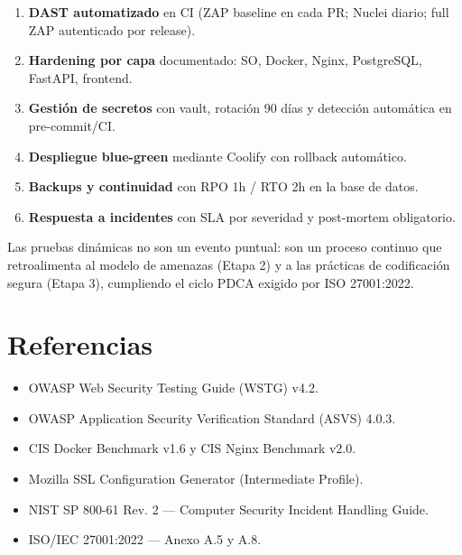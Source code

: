 \documentclass[12pt,a4paper,oneside]{article}
\begin{document}
\begin{enumerate}[leftmargin=*]
  \item \textbf{DAST automatizado} en CI (ZAP baseline en cada PR; Nuclei diario; full ZAP autenticado por release).
  \item \textbf{Hardening por capa} documentado: SO, Docker, Nginx, PostgreSQL, FastAPI, frontend.
  \item \textbf{Gestión de secretos} con vault, rotación 90 días y detección automática en pre-commit/CI.
  \item \textbf{Despliegue blue-green} mediante Coolify con rollback automático.
  \item \textbf{Backups y continuidad} con RPO 1h / RTO 2h en la base de datos.
  \item \textbf{Respuesta a incidentes} con SLA por severidad y post-mortem obligatorio.
\end{enumerate}

Las pruebas dinámicas no son un evento puntual: son un proceso continuo que retroalimenta al modelo de amenazas (Etapa 2) y a las prácticas de codificación segura (Etapa 3), cumpliendo el ciclo PDCA exigido por ISO 27001:2022.

\section*{Referencias}
\begin{itemize}[leftmargin=*]
  \item OWASP Web Security Testing Guide (WSTG) v4.2.
  \item OWASP Application Security Verification Standard (ASVS) 4.0.3.
  \item CIS Docker Benchmark v1.6 y CIS Nginx Benchmark v2.0.
  \item Mozilla SSL Configuration Generator (Intermediate Profile).
  \item NIST SP 800-61 Rev. 2 — Computer Security Incident Handling Guide.
  \item ISO/IEC 27001:2022 — Anexo A.5 y A.8.
\end{itemize}
\end{document}

